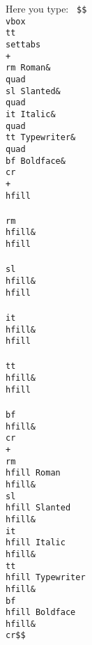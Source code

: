 Here you type:
\medskip
\vskip 10pt
\vbox{\tt {} \columns
\+\$\$\\vbox\lbr\\tt\\settabs\\+\\rm Roman\&\\quad\\sl Slanted\&\cr
\+\\quad\\it Italic\&\\quad\\tt Typewriter\&\\quad\\bf Boldface\&\\cr\cr
\+\\+\\hfill\\\\rm\\hfill\&\\hfill\\\\sl\\hfill\&\cr
\+\\hfill\\\\it\\hfill\&\\hfill\\\\tt\\hfill\&\\hfill\\\\bf\\hfill\&\\cr\cr
\+\\+\\rm\\hfill Roman\\hfill\&\\sl\\hfill Slanted\\hfill\&\\it\\hfill\cr
\+Italic\\hfill\&\\tt\\hfill Typewriter\\hfill\&\\bf\\hfill Boldface\\hfill\&\\cr\rbr\$\$\cr}

